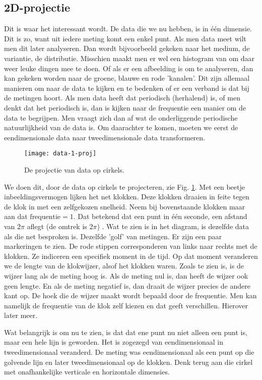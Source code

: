 \documentclass[11pt,fleqn]{book} %
\begin{document}
\subsection{2D-projectie}
Dit is waar het interessant wordt. De data die we nu hebben, is in één dimensie. Dit is zo, want uit iedere meting komt een enkel punt. Als men data meet wilt men dit later analyseren. Dan wordt bijvoorbeeld gekeken naar het medium, de variantie, de distributie. Misschien maakt men er wel een histogram van om daar weer leuke dingen mee te doen. Of als er een afbeelding is om te analyseren, dan kan gekeken worden naar de groene, blauwe en rode 'kanalen'. Dit zijn allemaal manieren om naar de data te kijken en te bedenken of er een verband is dat bij de metingen hoort. Als men data heeft dat periodisch (herhalend) is, of men denkt dat het periodisch is, dan is kijken naar de frequentie een manier om de data te begrijpen. Men vraagt zich dan af wat de onderliggende periodische natuurlijkheid van de data is. Om daarachter te komen, moeten we eerst de eendimensionale data naar tweedimensionale data transformeren.

\begin{figure}[h]
	\centering\texttt{[image: data-1-proj]}
	\caption{De projectie van data op cirkels.}
	\label{fig:data-1-proj}
\end{figure}

We doen dit, door de data op cirkels te projecteren, zie Fig. \ref{fig:data-1-proj}. Met een beetje inbeeldingsvermogen lijken het net klokken. Deze klokken draaien in feite tegen de klok in met een zelfgekozen snelheid. Neem bij bovenstaande klokken maar aan dat $\text{frequentie}=1$. Dat betekend dat een punt in één seconde, een afstand van $2\pi$ aflegt (de omtrek is $2\pi$) . Wat te zien is in het diagram, is dezelfde data als die net besproken is. Dezelfde 'golf' van metingen. Er zijn een paar markeringen te zien. De rode stippen corresponderen van links naar rechts met de klokken. Ze indiceren een specifiek moment in de tijd. Op dat moment veranderen we de lengte van de klokwijzer, alsof het klokken waren. Zoals te zien is, is de wijzer lang als de meting hoog is. Als de meting nul is, dan heeft de wijzer ook geen lengte. En als de meting negatief is, dan draait de wijzer precies de andere kant op. De hoek die de wijzer maakt wordt bepaald door de frequentie. Men kan namelijk de frequentie van de klok zelf kiezen en dat geeft verschillen. Hierover later meer.

Wat belangrijk is om nu te zien, is dat dat ene punt nu niet alleen een punt is, maar een hele lijn is geworden. Het is zogezegd van eendimensionaal in tweedimensionaal veranderd. De meting was eendimensionaal als een punt op die golvende lijn en later tweedimensionaal op de klokken. Denk terug aan die cirkel met onafhankelijke verticale en horizontale dimensies.
\end{document}
